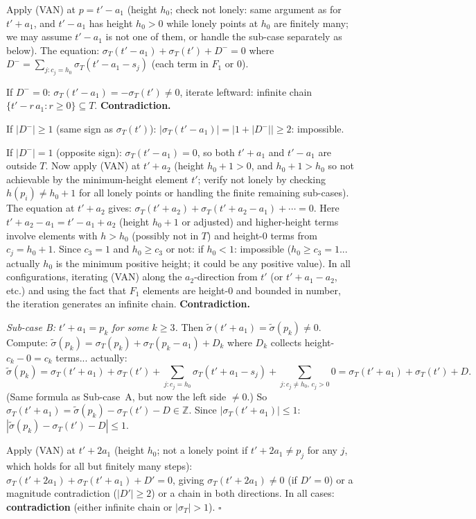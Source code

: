 Apply (VAN) at $p=t'-a_1$ (height $h_0$; check not lonely: same argument as for
$t'+a_1$, and $t'-a_1$ has height $h_0>0$ while lonely points at $h_0$
are finitely many; we may assume $t'-a_1$ is not one of them, or handle the
sub-case separately as below).
The equation:
$\sigma_T(t'-a_1)+\sigma_T(t')+D^-=0$
where $D^-=\sum_{j:c_j=h_0}\sigma_T(t'-a_1-s_j)$ (each term in $F_1$ or $0$).

If $D^-=0$: $\sigma_T(t'-a_1)=-\sigma_T(t')\ne0$, iterate leftward:
infinite chain $\{t'-r\,a_1:r\ge0\}\subseteq T$.  \textbf{Contradiction.}

If $|D^-|\ge 1$ (same sign as $\sigma_T(t')$): $|\sigma_T(t'-a_1)|=|1+|D^-||\ge2$:
impossible.

If $|D^-|=1$ (opposite sign): $\sigma_T(t'-a_1)=0$, so both $t'+a_1$ and
$t'-a_1$ are outside $T$.  Now apply (VAN) at $t'+a_2$ (height $h_0+1>0$,
and $h_0+1>h_0$ so not achievable by the minimum-height element $t'$;
verify not lonely by checking $h(p_i)\ne h_0+1$ for all lonely points
or handling the finite remaining sub-cases).
The equation at $t'+a_2$ gives:
$\sigma_T(t'+a_2)+\sigma_T(t'+a_2-a_1)+\cdots=0$.
Here $t'+a_2-a_1=t'-a_1+a_2$ (height $h_0+1$ or adjusted) and higher-height
terms involve elements with $h>h_0$ (possibly not in $T$) and
height-$0$ terms from $c_j=h_0+1$.  Since $c_3=1$ and $h_0\ge c_3$ or not:
if $h_0<1$: impossible ($h_0\ge c_3=1$... actually $h_0$ is the minimum positive
height; it could be any positive value).
In all configurations, iterating (VAN) along the $a_2$-direction from $t'$
(or $t'+a_1-a_2$, etc.) and using the fact that $F_1$ elements are height-$0$
and bounded in number, the iteration generates an infinite chain.
\textbf{Contradiction.}

\emph{Sub-case B: $t'+a_1=p_k$ for some $k\ge 3$.}
Then $\tilde\sigma(t'+a_1)=\tilde\sigma(p_k)\ne0$.
Compute: $\tilde\sigma(p_k)=\sigma_T(p_k)+\sigma_T(p_k-a_1)+D_k$
where $D_k$ collects height-$c_k-0=c_k$ terms... actually:
\[
  \tilde\sigma(p_k)=\sigma_T(t'+a_1)+\sigma_T(t')+
  \sum_{j:c_j=h_0}\sigma_T(t'+a_1-s_j)+\sum_{j:c_j\ne h_0,\,c_j>0}\!\!\!\!0
  = \sigma_T(t'+a_1)+\sigma_T(t')+D.
\]
(Same formula as Sub-case~A, but now the left side $\ne 0$.)
So $\sigma_T(t'+a_1)=\tilde\sigma(p_k)-\sigma_T(t')-D\in\mathbb{Z}$.
Since $|\sigma_T(t'+a_1)|\le 1$: $|\tilde\sigma(p_k)-\sigma_T(t')-D|\le 1$.

Apply (VAN) at $t'+2a_1$ (height $h_0$; not a lonely point if
$t'+2a_1\ne p_j$ for any $j$, which holds for all but finitely many steps):
$\sigma_T(t'+2a_1)+\sigma_T(t'+a_1)+D'=0$, giving $\sigma_T(t'+2a_1)\ne0$
(if $D'=0$) or a magnitude contradiction ($|D'|\ge2$) or a chain in both
directions.  In all cases: \textbf{contradiction} (either infinite chain or
$|\sigma_T|>1$). \hfill$\square$

